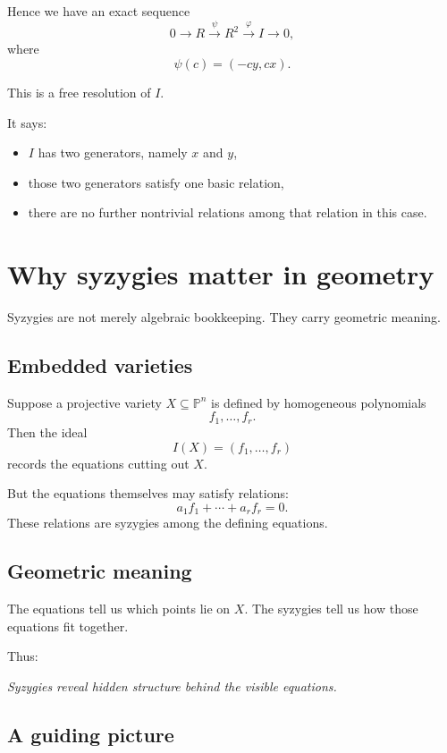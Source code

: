 \documentclass[11pt]{article}
\theoremstyle{definition}
\theoremstyle{remark}
\newcommand{\PP}{\mathbb{P}}
\begin{document}
	Hence we have an exact sequence
	\[
	0\to R \xrightarrow{\psi} R^2 \xrightarrow{\varphi} I\to 0,
	\]
	where
	\[
	\psi(c)=(-cy,cx).
	\]
	
	This is a free resolution of \(I\).
	
	It says:
	\begin{itemize}[leftmargin=2em]
		\item \(I\) has two generators, namely \(x\) and \(y\),
		\item those two generators satisfy one basic relation,
		\item there are no further nontrivial relations among that relation in this case.
	\end{itemize}
	
	\section{Why syzygies matter in geometry}
	
	Syzygies are not merely algebraic bookkeeping. They carry geometric meaning.
	
	\subsection{Embedded varieties}
	
	Suppose a projective variety \(X\subseteq \PP^n\) is defined by homogeneous polynomials
	\[
	f_1,\dots,f_r.
	\]
	Then the ideal
	\[
	I(X)=(f_1,\dots,f_r)
	\]
	records the equations cutting out \(X\).
	
	But the equations themselves may satisfy relations:
	\[
	a_1f_1+\cdots+a_rf_r=0.
	\]
	These relations are syzygies among the defining equations.
	
	\subsection{Geometric meaning}
	
	The equations tell us which points lie on \(X\).  
	The syzygies tell us how those equations fit together.
	
	Thus:
	\begin{center}
		\emph{Syzygies reveal hidden structure behind the visible equations.}
	\end{center}
	
	\subsection{A guiding picture}
	
\end{document}
